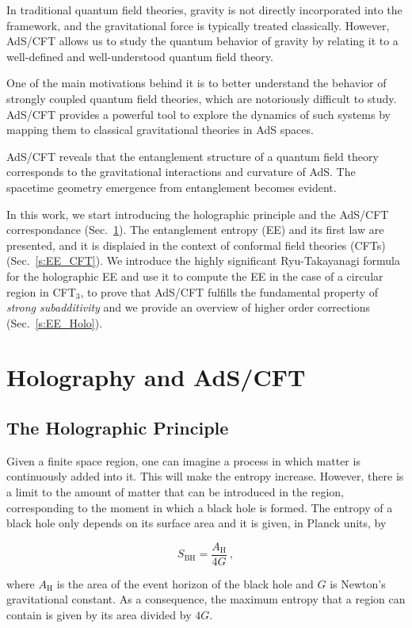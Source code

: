 \documentclass[twocolumn]{revtex4}
\providecommand{\eq}[2]{
    \begin{equation}
        #2
    \label{eq:#1}
    \end{equation}
}
\begin{document}
In traditional quantum field theories, gravity is not directly incorporated into the framework, and the gravitational force is typically treated classically. However, AdS/CFT allows us to study the quantum behavior of gravity by relating it to a well-defined and well-understood quantum field theory.

One of the main motivations behind it is to better understand the behavior of strongly coupled quantum field theories, which are notoriously difficult to study. AdS/CFT provides a powerful tool to explore the dynamics of such systems by mapping them to classical gravitational theories in AdS spaces.

AdS/CFT reveals that the entanglement structure of a quantum field theory corresponds to the gravitational interactions and curvature of AdS. The spacetime geometry emergence from entanglement becomes evident.

In this work, we start introducing the holographic principle and the AdS/CFT correspondance (Sec.~\ref{s:Holo_AdS/CFT}). The entanglement entropy (EE) and its first law are presented, and it is displaied in the context of conformal field theories (CFTs) (Sec.~\ref{s:EE_CFT}). We introduce the highly significant Ryu-Takayanagi formula for the holographic EE and use it to compute the EE in the case of a circular region in CFT$_3$, to prove that AdS/CFT fulfills the fundamental property of {\it strong subadditivity} and we provide an overview of higher order corrections (Sec.~\ref{s:EE_Holo}).


\section{Holography and AdS/CFT} \label{s:Holo_AdS/CFT}


\subsection{The Holographic Principle} \label{ss:Holography}

Given a finite space region, one can imagine a process in which matter is continuously added into it. This will make the entropy increase. However, there is a limit to the amount of matter that can be introduced in the region, corresponding to the moment in which a black hole is formed. The entropy of a black hole only depends on its surface area and it is given, in Planck units, by \cite{bekenstein_black_1973, hawking_particle_1975}
\eq{BH}{
    S_\text{BH} = \frac{ A_\text{H} }{ 4 G } \ ,
}
where $A_\text{H}$ is the area of the event horizon of the black hole and $G$ is Newton's gravitational constant. As a consequence, the maximum entropy that a region can contain is given by its area divided by $4G$.
\end{document}
